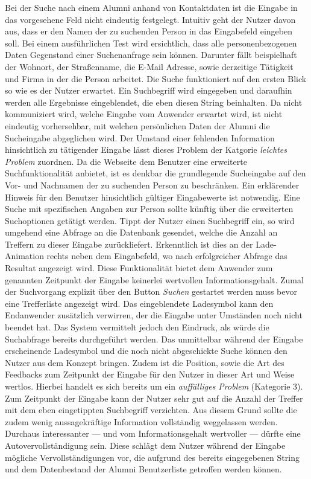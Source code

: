 {
	Bei der Suche nach einem Alumni anhand von Kontaktdaten ist die Eingabe in das vorgesehene Feld nicht eindeutig festgelegt. Intuitiv geht der Nutzer davon aus, dass er den Namen der zu suchenden Person in das Eingabefeld eingeben soll. Bei einem ausführlichen Test wird ersichtlich, dass alle personenbezogenen Daten Gegenstand einer Suchenanfrage sein können. Darunter fällt beispielhaft der Wohnort, der Straßenname, die E-Mail Adresse, sowie derzeitige Tätigkeit und Firma in der die Person arbeitet.
}
{
	Die Suche funktioniert auf den ersten Blick so wie es der Nutzer erwartet. Ein Suchbegriff wird eingegeben und daraufhin werden alle Ergebnisse eingeblendet, die eben diesen String  beinhalten. Da nicht kommuniziert wird, welche Eingabe vom Anwender erwartet wird, ist nicht eindeutig vorhersehbar, mit welchen persönlichen Daten der Alumni die Sucheingabe abgeglichen wird. Der Umstand einer fehlenden Information hinsichtlich zu tätigender Eingabe lässt dieses Problem der Katgorie \emph{leichtes Problem} zuordnen.
}
{
	Da die Webseite dem Benutzer eine erweiterte Suchfunktionalität anbietet, ist es denkbar die grundlegende Sucheingabe auf den Vor- und Nachnamen der zu suchenden Person zu beschränken. Ein erklärender Hinweis für den Benutzer hinsichtlich gültiger Eingabewerte ist notwendig. Eine Suche mit spezifischen Angaben zur Person sollte künftig über die erweiterten Suchoptionen getätigt werden.
}
{Tippt der Nutzer einen Suchbegriff ein, so wird umgehend eine Abfrage an die Datenbank gesendet, welche die Anzahl an Treffern zu dieser Eingabe zurückliefert. Erkenntlich ist dies an der Lade-Animation rechts neben dem Eingabefeld, wo nach erfolgreicher Abfrage das Resultat angezeigt wird. Diese Funktionalität bietet dem Anwender zum genannten Zeitpunkt der Eingabe keinerlei wertvollen Informationsgehalt. Zumal der Suchvorgang explizit über den Button \emph{Suchen} gestartet werden muss bevor eine Trefferliste angezeigt wird. Das eingeblendete Ladesymbol kann den Endanwender zusätzlich verwirren, der die Eingabe unter Umständen noch nicht beendet hat. Das System vermittelt jedoch den Eindruck, als würde die Suchabfrage bereits durchgeführt werden.}
{
	Das unmittelbar während der Eingabe erscheinende Ladesymbol und die noch nicht abgeschickte Suche können den Nutzer aus dem Konzept bringen. Zudem ist die Position, sowie die Art des Feedbacks zum Zeitpunkt der Eingabe für den Nutzer in dieser Art und Weise wertlos. Hierbei handelt es sich bereits um ein \emph{auffälliges Problem} (Kategorie 3).
}
{
	Zum Zeitpunkt der Eingabe kann der Nutzer sehr gut auf die Anzahl der Treffer mit dem eben eingetippten Suchbegriff verzichten. Aus diesem Grund sollte die zudem wenig aussagekräftige Information vollständig weggelassen werden. Durchaus interessanter --- und vom Informationsgehalt wertvoller --- dürfte eine Autovervollständigung sein. Diese schlägt dem Nutzer während der Eingabe mögliche Vervollständigungen vor, die aufgrund des bereits eingegebenen String und dem Datenbestand der Alumni Benutzerliste getroffen werden können.
} 

